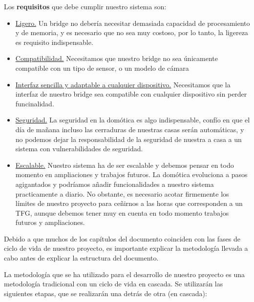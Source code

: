 Los \textbf{requisitos} que debe cumplir nuestro sistema son:
\begin{itemize}
  \item \underline{Ligero.} Un bridge no debería necesitar demasiada capacidad de procesamiento y de memoria, y es necesario que no sea muy costoso, por lo tanto, la ligereza es requisito indispensable.
  \item \underline{Compatibilidad.} Necesitamos que nuestro bridge no sea únicamente compatible con un tipo de sensor, o un modelo de cámara
  \item \underline{Interfaz sencilla y adaptable a cualquier dispositivo.} Necesitamos que la interfaz de nuestro bridge sea compatible con cualquier dispositivo sin perder funcinalidad.
  \item \underline{Seguridad.} La seguridad en la domótica es algo indispensable, confío en que el día de mañana incluso las cerraduras de nuestras casas serán automáticas, y no podemos dejar la responsabilidad de la seguridad
  de nuestra a casa a un sistema con vulnerabilidades de seguridad.
  \item \underline{Escalable.} Nuestro sistema ha de ser escalable y debemos pensar en todo momento en ampliaciones y trabajos futuros. La domótica evoluciona a pasos agigantados y podríamos añadir funcionalidades a nuestro 
  sistema practicamente a diario. No obstante, es necesario acotar firmemente los límites de nuestro proyecto para ceñirnos a las horas que corresponden a un TFG, aunque debemos tener muy en cuenta en todo momento trabajos futuros y ampliaciones.
\end{itemize}



Debido a que muchos de los capítulos del documento coinciden con las fases de ciclo de vida de nuestro proyecto, es importante explicar la metodología llevada a cabo antes de explicar la estructura del documento.
\par
La metodología que se ha utilizado para el desarrollo de nuestro proyecto es una metodología tradicional con un ciclo de vida en cascada. Se utilizarán las siguientes etapas, que se realizarán una detrás de otra (en cascada):

